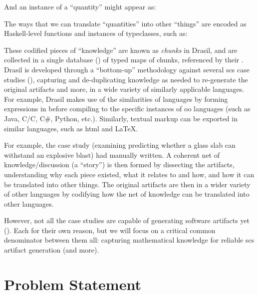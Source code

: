 \originalQuantityDictHaskell{}

And an instance of a ``quantity'' might appear as:\\

\originalQuantityDictExampleHaskell{}

The ways that we can translate ``quantities'' into other ``things'' are encoded
as Haskell-level functions and instances of typeclasses, such as:


These codified pieces of ``knowledge'' are known as \textit{chunks} in Drasil,
and are collected in a single database () of typed
maps of chunks, referenced by their . Drasil is developed through a
``bottom-up'' methodology against several \acs{scs} case studies
(), capturing and de-duplicating knowledge as needed to
re-generate the original artifacts and more, in a wide variety of similarly
applicable languages. For example, Drasil makes use of the similarities of
 languages by forming expressions in  before compiling to the
specific instances of \acs{oo} languages (such as Java, C/C\+\+, C\#, Python,
etc.). Similarly, textual markup can be exported in similar languages, such as
\acs{html} and \LaTeX{}.

For example, the  case study (examining predicting whether a glass
slab can withstand an explosive blast) had 
manually written. A coherent net of knowledge/discussion (a ``story'') is then
formed by dissecting the artifacts, understanding why each piece existed, what
it relates to and how, and how it can be translated into other things. The
original artifacts are then
in a wider variety of other languages by codifying how the net of knowledge can
be translated into other languages.

However, not all the case studies are capable of generating software artifacts
yet (). Each for their own reason, but we will focus
on a critical common denominator between them all: capturing mathematical
knowledge for reliable \acs{scs} artifact generation (and more).

\section{Problem Statement}
\label{sec:intro:problemStatement}

